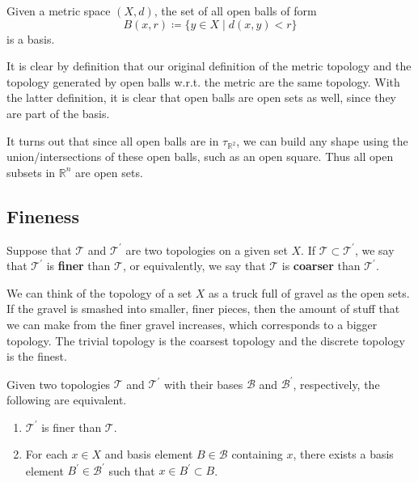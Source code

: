 \documentclass{article}
\begin{document}
    \begin{theorem} 
      Given a metric space $(X, d)$, the set of all open balls of form 
      \begin{equation}
        B(x, r) \coloneqq \{y \in X \mid d(x, y) < r \}
      \end{equation} 
      is a basis. 
    \end{theorem} 

    It is clear by definition that our original definition of the metric topology and the topology generated by open balls w.r.t. the metric are the same topology. With the latter definition, it is clear that open balls are open sets as well, since they are part of the basis.  

    It turns out that since all open balls are in $\tau_{\mathbb{R}^{2}}$, we can build any shape using the union/intersections of these open balls, such as an open square. Thus all open subsets in $\mathbb{R}^{n}$ are open sets. 

  \subsection{Fineness}

      \begin{definition}
        Suppose that $\mathscr{T}$ and $\mathscr{T}^\prime$ are two topologies on a given set $X$. If $\mathscr{T} \subset \mathscr{T}^\prime$, we say that $\mathscr{T}^\prime$ is \textbf{finer} than $\mathscr{T}$, or equivalently, we say that $\mathscr{T}$ is \textbf{coarser} than $\mathscr{T}^\prime$. 
      \end{definition}

      We can think of the topology of a set $X$ as a truck full of gravel as the open sets. If the gravel is smashed into smaller, finer pieces, then the amount of stuff that we can make from the finer gravel increases, which corresponds to a bigger topology. The trivial topology is the coarsest topology and the discrete topology is the finest. 

      \begin{lemma}
        Given two topologies $\mathscr{T}$ and $\mathscr{T}^\prime$ with their bases $\mathscr{B}$ and $\mathscr{B}^\prime$, respectively, the following are equivalent. 
        \begin{enumerate}
          \item $\mathscr{T}^\prime$ is finer than $\mathscr{T}$. 
          \item For each $x \in X$ and basis element $B \in \mathscr{B}$ containing $x$, there exists a basis element $B^\prime \in \mathscr{B}^\prime$ such that $x \in B^\prime \subset B$. 
        \end{enumerate}
      \end{lemma}
\end{document}
